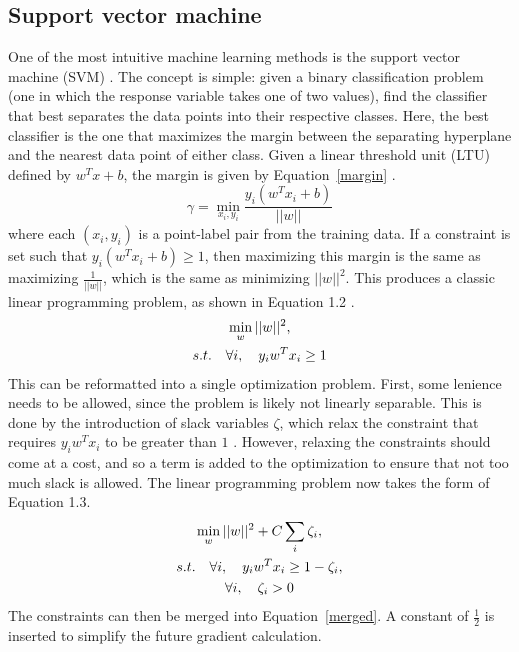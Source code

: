 \subsection{Support vector machine}
One of the most intuitive machine learning methods is the support vector machine (SVM) \cite{cortes1995}.  The concept is simple: given a binary classification problem (one in which the response variable takes one of two values), find the classifier that best separates the data points into their respective classes.  Here, the best classifier is the one that maximizes the margin between the separating hyperplane and the nearest data point of either class.  Given a linear threshold unit (LTU) defined by $w^Tx + b$, the margin is given by Equation~\ref{margin} \cite{boser1992}.
%
\begin{equation}
\gamma = \min \limits_{x_i, y_i} \frac{y_i (w^T x_i + b)}{||w||}
\label{margin}
\end{equation}
%
where each $(x_i, y_i)$ is a point-label pair from the training data.  If a constraint is set such that $y_i (w^T x_i + b) \geq 1$, then maximizing this margin is the same as maximizing $\frac{1}{||w||}$, which is the same as minimizing $||w||^2$.  This produces a classic linear programming problem, as shown in Equation 1.2 \cite{boser1992}.
%
\begin{gather}
\min \limits_{w} ||w||^2, \\ \notag
s.t. \quad \forall i, \quad y_i w^T x_i \geq 1
\end{gather}
%
This can be reformatted into a single optimization problem.  First, some lenience needs to be allowed, since the problem is likely not linearly separable.  This is done by the introduction of slack variables $\zeta$, which relax the constraint that requires $y_i w^T x_i$ to be greater than $1$ \cite{cortes1995}.  However, relaxing the constraints should come at a cost, and so a term is added to the optimization to ensure that not too much slack is allowed.  The linear programming problem now takes the form of Equation 1.3.
%
\begin{gather}
\min \limits_{w} ||w||^2 + C \sum_i \zeta_i, \\ \notag
s.t. \quad \forall i, \quad y_i w^T x_i \geq 1 - \zeta_i, \\ \notag
\forall i, \quad \zeta_i > 0
\end{gather}
%
The constraints can then be merged into Equation~\ref{merged}.  A constant of $\frac{1}{2}$ is inserted to simplify the future gradient calculation.
